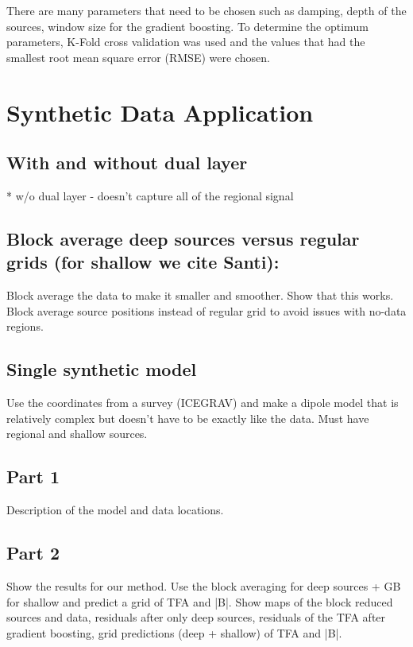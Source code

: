 

There are many parameters that need to be chosen such as damping, depth of the sources, window size for the gradient boosting. To determine the optimum parameters, K-Fold cross validation was used and the values that had the smallest root mean square error (RMSE) were chosen.

\section{Synthetic Data Application}

\subsection{With and without dual layer}
* w/o dual layer - doesn't capture all of the regional signal

\subsection{Block average deep sources versus regular grids (for shallow we cite Santi):}
Block average the data to make it smaller and smoother. Show that this works.
Block average source positions instead of regular grid to avoid issues with no-data regions.

\subsection{Single synthetic model}
Use the coordinates from a survey (ICEGRAV) and make a dipole model that is relatively complex but doesn't have to be exactly like the data. Must have regional and shallow sources.


\subsection{Part 1}
Description of the model and data locations.

\subsection{Part 2}
Show the results for our method. Use the block averaging for deep sources + GB for shallow and predict a grid of TFA and |B|. Show maps of the block reduced sources and data, residuals after only deep sources, residuals of the TFA after gradient boosting, grid predictions (deep + shallow) of TFA and |B|.

